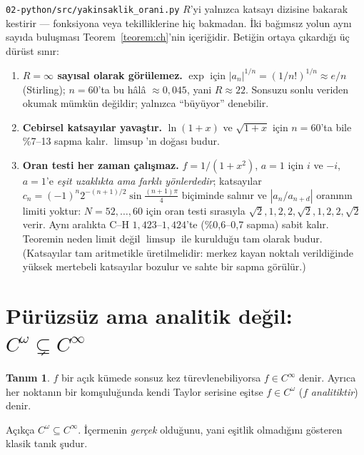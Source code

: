 \documentclass[11pt,a4paper]{article}
\theoremstyle{plain}
\theoremstyle{definition}
\newtheorem{tanim}[teorem]{Tanım}
\theoremstyle{remark}
\begin{document}
\texttt{02-python/src/yakinsaklik\_orani.py} $R$'yi yalnızca katsayı dizisine
bakarak kestirir --- fonksiyona veya tekilliklerine hiç bakmadan. İki bağımsız
yolun aynı sayıda buluşması Teorem~\ref{teorem:ch}'nin içeriğidir. Betiğin
ortaya çıkardığı üç dürüst sınır:

\begin{enumerate}[leftmargin=*]
\item \textbf{$R=\infty$ sayısal olarak görülemez.} $\exp$ için
      $|a_n|^{1/n} = (1/n!)^{1/n} \approx e/n$ (Stirling); $n=60$'ta bu hâlâ
      $\approx 0{,}045$, yani $R \approx 22$. Sonsuzu sonlu veriden okumak
      mümkün değildir; yalnızca ``büyüyor'' denebilir.
\item \textbf{Cebirsel katsayılar yavaştır.} $\ln(1+x)$ ve $\sqrt{1+x}$ için
      $n=60$'ta bile \%7--13 sapma kalır. $\limsup$'ın doğası budur.
\item \textbf{Oran testi her zaman çalışmaz.} $f = 1/(1+x^2)$, $a=1$ için
      $i$ ve $-i$, $a=1$'e \emph{eşit uzaklıkta ama farklı yönlerdedir};
      katsayılar $c_n=(-1)^n 2^{-(n+1)/2}\sin\frac{(n+1)\pi}{4}$ biçiminde
      salınır ve $|a_n/a_{n+d}|$ oranının limiti yoktur: $N=52,\dots,60$ için
      oran testi sırasıyla $\sqrt2,1,2,2,\sqrt2,1,2,2,\sqrt2$ verir. Aynı
      aralıkta C--H $1{,}423$--$1{,}424$'te (\%0{,}6--0{,}7 sapma) sabit
      kalır. Teoremin neden limit değil $\limsup$ ile kurulduğu tam olarak
      budur. (Katsayılar tam aritmetikle üretilmelidir: merkez kayan noktalı
      verildiğinde yüksek mertebeli katsayılar bozulur ve sahte bir sapma
      görülür.)
\end{enumerate}

\section{Pürüzsüz ama analitik değil: \texorpdfstring{$C^\omega \subsetneq C^\infty$}{Cω ⊊ C∞}}
\label{sec:analitik-degil}

\begin{tanim}
$f$ bir açık kümede sonsuz kez türevlenebiliyorsa $f \in C^\infty$ denir.
Ayrıca her noktanın bir komşuluğunda kendi Taylor serisine eşitse $f \in
C^\omega$ ($f$ \emph{analitiktir}) denir.
\end{tanim}

Açıkça $C^\omega \subseteq C^\infty$. İçermenin \emph{gerçek} olduğunu, yani
eşitlik olmadığını gösteren klasik tanık şudur.
\end{document}
